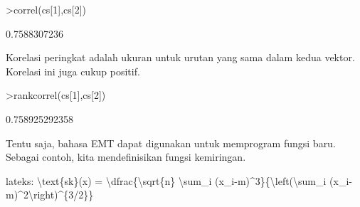 \documentclass[12pt,Times new roman,letterpaper]{book}
\begin{document}
\begin{eulernootebook}
\begin{eulercomment}
\begin{eulercomment}
\begin{eulernootebook}
\begin{eulercomment}
\begin{eulercomment}
\begin{eulercomment}
\begin{eulercomment}
\begin{eulercomment}
\begin{eulercomment}
\begin{eulercomment}
\begin{eulerprompt}
>correl(cs[1],cs[2])
\end{eulerprompt}
\begin{euleroutput}
  0.7588307236
\end{euleroutput}
\begin{eulercomment}
Korelasi peringkat adalah ukuran untuk urutan yang sama dalam kedua
vektor. Korelasi ini juga cukup positif.
\end{eulercomment}
\begin{eulerprompt}
>rankcorrel(cs[1],cs[2])
\end{eulerprompt}
\begin{euleroutput}
  0.758925292358
\end{euleroutput}
\begin{eulercomment}
Tentu saja, bahasa EMT dapat digunakan untuk memprogram fungsi baru.
Sebagai contoh, kita mendefinisikan fungsi kemiringan.

lateks: \textbackslash{}text\{sk\}(x) = \textbackslash{}dfrac\{\textbackslash{}sqrt\{n\} \textbackslash{}sum\_i (x\_i-m)\textasciicircum{}3\}\{\textbackslash{}left(\textbackslash{}sum\_i
(x\_i-m)\textasciicircum{}2\textbackslash{}right)\textasciicircum{}\{3/2\}\}


\end{eulercomment}
\end{eulercomment}
\end{eulercomment}
\end{eulercomment}
\end{eulercomment}
\end{eulercomment}
\end{eulercomment}
\end{eulercomment}
\end{eulernootebook}
\end{eulercomment}
\end{eulercomment}
\end{eulernootebook}
\end{document}
